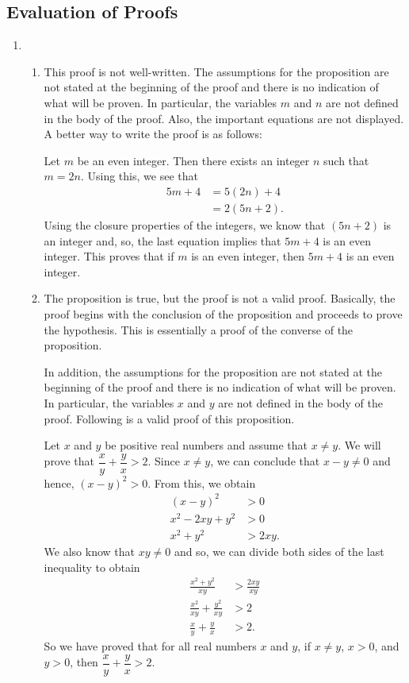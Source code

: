 \subsection*{Evaluation of Proofs}
\setcounter{oldenumi}{\theenumi}
\begin{enumerate} \setcounter{enumi}{\theoldenumi}
\item \begin{enumerate}
\item This proof is not well-written.  The assumptions for the proposition are not stated at the beginning of the proof and there is no indication of what will be proven.  In particular, the variables $m$ and $n$ are not defined in the body of the proof. Also,  the important equations are not displayed.  A better way to write the proof is as follows:

\begin{myproof}
Let $m$ be an even integer.  Then there exists an integer $n$ such that $m = 2n$.  Using this, we see that
\begin{align*}
5m + 4 &= 5(2n) + 4 \\
       &= 2(5n + 2).
\end{align*}
Using the closure properties of the integers, we know that $(5n + 2)$ is an integer and, so, the last equation implies that $5m + 4$ is an even integer.  This proves that if $m$ is an even  integer, then $5m + 4$ is an even integer.
\end{myproof}


\item The proposition is true, but the proof is not a valid proof.  Basically, the proof begins with the conclusion of the proposition and proceeds to prove the hypothesis.  This is essentially a proof of the converse of the proposition.


In addition, the assumptions for the proposition are not stated at the beginning of the proof and there is no indication of what will be proven.  In particular, the variables $x$ and $y$ are not defined in the body of the proof.  
Following is a valid proof of this proposition.

\begin{myproof}
Let $x$ and $y$ be positive real numbers and assume that $x \ne y$.  We will prove that 
$\dfrac{x}{y} + \dfrac{y}{x} > 2$.  Since $x \ne y$, we can conclude that $x - y \ne 0$ and hence, $(x - y)^2 > 0$.  From this, we obtain
\begin{align*}
      (x - y)^2 &> 0 \\
x^2 - 2xy + y^2 &> 0 \\
      x^2 + y^2 &> 2xy.
\end{align*}
We also know that $xy \ne 0$ and so, we can divide both sides of the last inequality to obtain
\begin{align*}
           \frac{x^2 + y^2 }{xy}&> \frac{2xy}{xy} \\
\frac{x^2}{xy} + \frac{y^2}{xy} &> 2 \\
      \frac{x}{y} + \frac{y}{x} &> 2.
\end{align*}
So we have proved that for all real numbers $x$ and $y$, if $x \ne y$, $x > 0$, and $y >0$, then $\dfrac{x}{y} + \dfrac{y}{x} > 2$.
\end{myproof}



\end{enumerate}
\end{enumerate}
